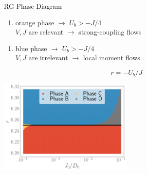 \documentclass[8pt,aspectratio=169]{beamer}
\newcommand{\nitem}{\item[\ding{51}]}
\begin{document}
\begin{frame}{RG Phase Diagram}
\centering

\begin{minipage}{0.49\textwidth}
\begin{enumerate}
	\nitem orange phase \(\longrightarrow\) \(U_b > -J/4\) \\[10pt]
	\(V,J\) are \alert{relevant} \(\longrightarrow\) strong-coupling flows\\[10pt]
\end{enumerate}
\end{minipage}
\begin{minipage}{0.49\textwidth}
\begin{enumerate}
	\nitem blue phase \(\longrightarrow\) \(U_b > -J/4\)\\[10pt]
	\(V,J\) are \alert{irrelevant} \(\longrightarrow\) local moment flows
\end{enumerate}
\end{minipage}

\[r = - U_b/J\]

\includegraphics[width=0.5\textwidth]{phase-map-MIT.png}

\end{frame}
\end{document}
